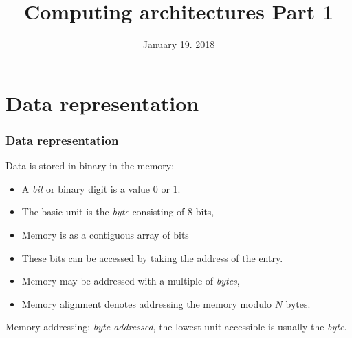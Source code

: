 

\title{Computing architectures Part 1}
\date{January 19. 2018}
\maketitle

\section{Data representation}

\begin{frame}
  \frametitle{Data representation}

Data is stored in binary in the memory:
\begin{itemize}
\item A \textit{bit} or binary digit is a value $0$ or $1$.
\item The basic unit is the \textit{byte} consisting of 8 bits,
\item Memory is as a contiguous array of bits 
\item These bits can be accessed by taking the address of the entry.
\item Memory may be addressed with a multiple of \textit{bytes},
\item Memory alignment denotes addressing the memory modulo $N$ bytes.
\end{itemize}

\bigskip
{}

\bigskip
Memory addressing: \textit{byte-addressed}, the lowest unit accessible is usually the \textit{byte}.
\end{frame}

